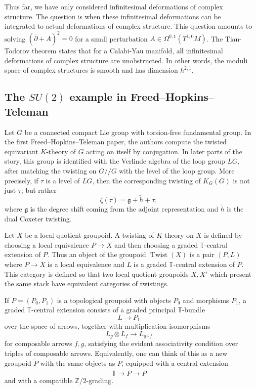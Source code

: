 \documentclass[12pt]{article}
\begin{document}
Thus far, we have only considered infinitesimal deformations of complex structure. The question is when these infinitesimal deformations can be integrated to actual deformations of complex structure. This question amounts to solving $(\overline\partial + A)^2 = 0$ for a small perturbation $A \in \Omega^{0,1}(T^{1,0}M)$. The Tian-Todorov theorem states that for a Calabi-Yau manifold, all infinitesimal deformations of complex structure are unobstructed. In other words, the moduli space of complex structures is smooth and has dimension $h^{2,1}$.

\subsection{The $SU(2)$ example in Freed--Hopkins--Teleman}

Let $G$ be a connected compact Lie group with torsion-free fundamental group. In the first Freed--Hopkins--Teleman paper, the authors compute the twisted equivariant $K$-theory of $G$ acting on itself by conjugation. In later parts of the story, this group is identified with the Verlinde algebra of the loop group $LG$, after matching the twisting on $G//G$ with the level of the loop group. More precisely, if $\tau$ is a level of $LG$, then the corresponding twisting of $K_G(G)$ is not just $\tau$, but rather
\[
    \zeta(\tau)=\mathfrak g+\check h+\tau,
\]
where $\mathfrak g$ is the degree shift coming from the adjoint representation and $\check h$ is the dual Coxeter twisting.

Let $X$ be a local quotient groupoid. A twisting of $K$-theory on $X$ is defined by choosing a local equivalence $P \longrightarrow X$
and then choosing a graded $\mathbb T$-central extension of $P$. Thus an object of the groupoid $\operatorname{Twist}(X)$ is a pair $(P,L)$
where $P\to X$ is a local equivalence and $L$ is a graded $\mathbb T$-central extension of $P$. This category is defined so that two local quotient groupoids $X,X'$ which present the same stack have equivalent categories of twistings.

If $P=(P_0,P_1)$ is a topological groupoid with objects $P_0$ and morphisms $P_1$, a graded $\mathbb T$-central extension consists of a graded principal $\mathbb T$-bundle
\[
    L\longrightarrow P_1
\]
over the space of arrows, together with multiplication isomorphisms
\[
    L_g\otimes L_f \longrightarrow L_{g\circ f}
\]
for composable arrows $f,g$, satisfying the evident associativity condition over triples of composable arrows. Equivalently, one can think of this as a new groupoid $\widetilde P$ with the same objects as $P$, equipped with a central extension
\[
    \mathbb T \longrightarrow \widetilde P \longrightarrow P
\]
and with a compatible $\mathbb Z/2$-grading.
\end{document}
